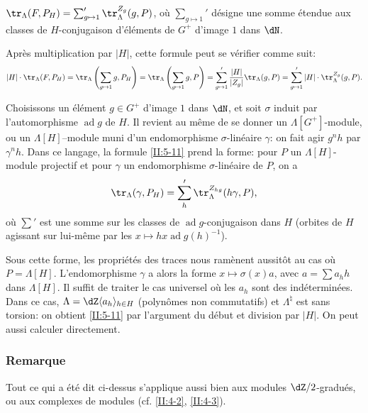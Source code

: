 \begin{proposition_}\label{II:5-11}
$\tr_\Lambda(F,P_H) = \sum_{g\mapsto 1}' \tr_\Lambda^{Z_g}(g,P)$, où 
$\sum_{g\mapsto 1}'$ désigne une somme étendue aux classes de 
$H$-conjugaison d'éléments de $G^+$ d'image $1$ dans $\dN$. 
\end{proposition_}

Après multiplication par $|H|$, cette formule peut se vérifier comme suit: 
\[
  |H|\cdot \tr_\Lambda(F,P_H) 
    = \tr_\Lambda\left(\sum_{g\mapsto 1} g,P_H\right) 
    = \tr_\Lambda\left(\sum_{g\mapsto 1} g,P\right) 
    = \sum_{g\mapsto 1}' \frac{|H|}{|Z_g|}\tr_\Lambda(g,P) 
    = \sum_{g\mapsto 1}' |H|\cdot \tr_\Lambda^{Z_g}(g,P) \text{.}
\]

Choisissons un élément $g\in G^+$ d'image $1$ dans $\dN$, et soit 
$\sigma$  induit par l'automorphisme 
$\operatorname{ad} g$ de $H$. Il revient au même de se donner un 
$\Lambda[G^+]$-module, ou un $\Lambda[H]$--module muni d'un endomorphisme 
$\sigma$-linéaire $\gamma$: on fait agir $g^n h$ par $\gamma^n h$. Dans ce 
langage, la formule \ref{II:5-11} prend la forme: pour $P$ un 
$\Lambda[H]$-module projectif et pour $\gamma$ un endomorphisme 
$\sigma$-linéaire de $P$, on a 
\[
  \tr_\Lambda(\gamma,P_H) = \sum_h' \tr_\Lambda^{Z_{hg}}(h\gamma,P)\text{,}
\]
où $\sum'$ est une somme sur les classes de $\operatorname{ad}g$-conjugaison 
dans $H$ (orbites de $H$ agissant sur lui-même par les 
$x\mapsto h x \operatorname{ad} g(h)^{-1}$). 

Sous cette forme, les propriétés des traces nous ramènent aussitôt au 
cas où $P=\Lambda[H]$. L'endomorphisme $\gamma$ a alors la forme 
$x\mapsto \sigma(x) a$, avec $a=\sum a_h h$ dans $\Lambda[H]$. Il suffit de 
traiter le cas universel où les $a_h$ sont des indéterminées. Dans ce 
cas, $\Lambda=\dZ\langle a_h\rangle_{h\in H}$ (polynômes non commutatifs) et 
$\Lambda^\natural$ est sans torsion: on obtient \ref{II:5-11} par l'argument 
du début et division par $|H|$. On peut aussi calculer directement. 





\subsubsection{Remarque}\label{II:5-11-1}

Tout ce qui a été dit ci-dessus s'applique aussi bien aux modules 
$\dZ/2$-gradués, ou aux complexes de modules (cf. \ref{II:4-2}, \ref{II:4-3}). 





